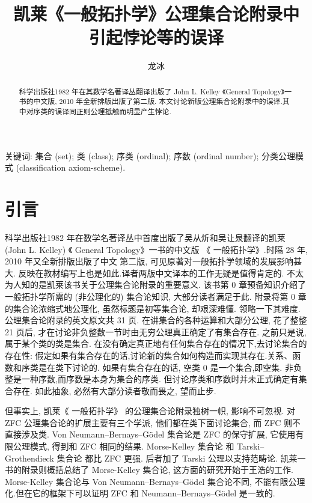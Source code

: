 \documentclass[zihao=-4,a4paper]{ctexart}
\title{凯莱《一般拓扑学》公理集合论附录中\\ 引起悖论等的误译}
\author{龙\quad 冰}
\date{}
\begin{document}
\maketitle
\begin{abstract}
科学出版社1982 年在其数学名著译丛翻译出版了 John L. Kelley 《General Topology》一书的中文版,  2010 年全新排版出版了第二版.
本文讨论新版公理集合论附录中的误译.其中对序类的误译同正则公理抵触而明显产生悖论.
\end{abstract}
	
关键词: 集合 (set); 类 (class); 序类 (ordinal); 
	序数 (ordinal number); 
	分类公理模式 (classification axiom-scheme).
	
	
	
\section{引言}
科学出版社1982 年在数学名著译丛中首度出版了吴从炘和吴让泉翻译的凯莱  (John L. Kelley) 《 General  Topology》\cite{jkelley1975}一书的中文版 《 一般拓扑学》.时隔 28 年, 2010 年又全新排版出版了中文 第二版\cite{jkelley2010zh}, 可见原著对一般拓扑学领域的发展影响甚大. 反映在教材编写上也是如此\cite{PuJiangHu1985}.译者两版中文译本的工作无疑是值得肯定的. 不太为人知的是凯莱该书关于公理集合论附录的重要意义. 该书第 0 章预备知识介绍了一般拓扑学所需的 (非公理化的) 集合论知识, 大部分读者满足于此. 
附录将第 0 章的集合论浓缩式地公理化, 虽然标题是初等集合论, 却艰深难懂. 领略一下其难度. 公理集合论附录的英文原文共 31 页. 在讲集合的各种运算和大部分公理, 花了整整 21 页后,
才在讨论非负整数一节时由无穷公理真正确定了有集合存在. 之前只是说, 属于某个类的类是集合. 在没有确定真正地有任何集合存在的情况下,去讨论集合的存在性: 假定如果有集合存在的话,讨论新的集合如何构造而实现其存在.关系、函数和序类是在类下讨论的. 如果有集合存在的话, 空类 0 是一个集合,即空集.
非负整是一种序数,而序数是本身为集合的序类. 但讨论序类和序数时并未正式确定有集合存在.
如此抽象, 必然有大部分读者敬而畏之, 望而止步. 

但事实上, 凯莱《 一般拓扑学》 的公理集合论附录独树一帜, 影响不可忽视. 对 ZFC 公理集合论\cite{jjiang1991}\cite{enderton1977}的扩展主要有三个学派\cite{wikiSetTheory}, 他们都在类下面讨论集合, 而 ZFC 则不直接涉及类. Von Neumann–Bernays–Gödel 集合论\cite{wikiNBGSetTheory}是 ZFC 的保守扩展,  它使用有限公理模式, 得到和 ZFC 相同的结果. 
Morse-Kelley 集合论\cite{wikiMKSetTheory} 和 Tarski–Grothendieck 集合论\cite{wikiTGSetTheory} 都比 ZFC 更强. 后者加了 Tarski 公理以支持范畴论. 凯莱一书的附录则概括总结了 Morse-Kelley 集合论,
这方面的研究开始于王浩的工作\cite{wang1949}. Morse-Kelley 集合论与 Von Neumann–Bernays–Gödel  集合论不同, 不能有限公理化.但在它的框架下可以证明 ZFC 和 Neumann–Bernays–Gödel 是一致的.
\end{document}
